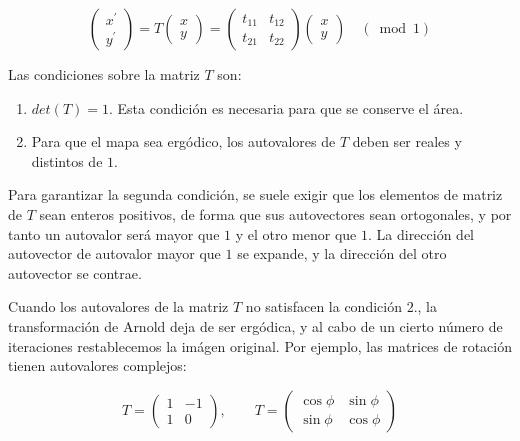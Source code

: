 \documentclass[11pt, a4paper]{article} %
\theoremstyle{named}
\begin{document}
            $$
            \left(\begin{array}{l}
            {x^{\prime}} \\
            {y^{\prime}}
            \end{array}\right)=T\left(\begin{array}{l}
            {x} \\
            {y}
            \end{array}\right)=\left(\begin{array}{ll}
            {t_{11}} & {t_{12}} \\
            {t_{21}} & {t_{22}}
            \end{array}\right)\left(\begin{array}{l}
            {x} \\
            {y}
            \end{array}\right) \quad(\bmod 1)
            $$

            Las condiciones sobre la matriz $T$ son:

            \begin{enumerate}
                \item $det(T) = 1$. Esta condición es necesaria para que se conserve el área.
                \item Para que el mapa sea ergódico, los autovalores de $T$ deben ser reales y distintos de $1$.
            \end{enumerate}

            Para garantizar la segunda condición, se suele exigir que los elementos de matriz de $T$ sean enteros positivos, de forma que sus autovectores sean ortogonales, y por tanto un autovalor será mayor que $1$ y el otro menor que $1$. La dirección del autovector de autovalor mayor que $1$ se expande, y la dirección del otro autovector se contrae.

            Cuando los autovalores de la matriz $T$ no satisfacen la condición $2.$, la transformación de Arnold deja de ser ergódica, y al cabo de un cierto número de iteraciones restablecemos la imágen original. Por ejemplo, las matrices de rotación tienen autovalores complejos:

            $$
            T = \begin{pmatrix} 1 & -1 \\ 1 & 0
            \end{pmatrix}, \qquad
            T = \begin{pmatrix} \cos\phi & \sin\phi \\ \sin\phi & \cos\phi
            \end{pmatrix}
            $$
\end{document}
